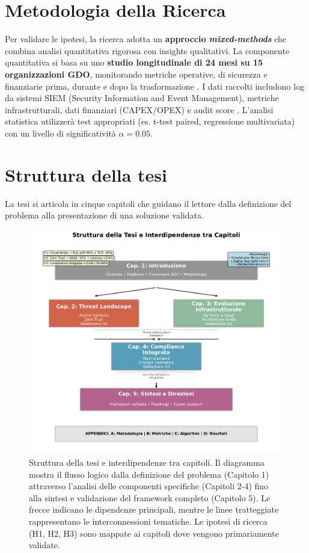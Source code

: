 \begin{refsection}
\section{Metodologia della Ricerca}
Per validare le ipotesi, la ricerca adotta un  \textbf{approccio \textit{mixed-methods}} che combina analisi quantitativa rigorosa con insights qualitativi. La componente quantitativa si basa su uno
\textbf{studio longitudinale di 24 mesi su 15 organizzazioni GDO}, monitorando metriche operative, di sicurezza e finanziarie prima, durante e dopo la trasformazione . I dati raccolti includono log da sistemi SIEM (Security Information and Event Management), metriche infrastrutturali, dati finanziari (CAPEX/OPEX) e audit score . L'analisi statistica utilizzerà test appropriati (es. t-test paired, regressione multivariata) con un livello di significatività $\alpha=0.05$.

\section{Struttura della tesi}
La tesi si articola in cinque capitoli che guidano il lettore dalla definizione del problema alla presentazione di una soluzione validata.

\begin{figure}[htbp]
\centering
\includegraphics[width=\textwidth]{thesis_figures/cap1/fig_1_4_thesis_structure.pdf}
\caption{Struttura della tesi e interdipendenze tra capitoli. Il diagramma mostra il flusso logico dalla definizione del problema (Capitolo 1) attraverso l'analisi delle componenti specifiche (Capitoli 2-4) fino alla sintesi e validazione del framework completo (Capitolo 5). Le frecce indicano le dipendenze principali, mentre le linee tratteggiate rappresentano le interconnessioni tematiche. Le ipotesi di ricerca (H1, H2, H3) sono mappate ai capitoli dove vengono primariamente validate.}
\label{fig:thesis_structure}
\end{figure}



\end{refsection}
